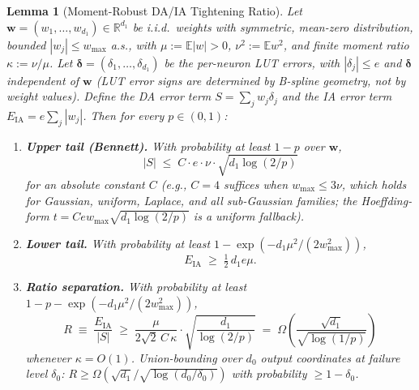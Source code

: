 \documentclass[journal,onecolumn]{IEEEtran}
\newtheorem{lemma}{Lemma}
\begin{document}
\setcounter{lemma}{2}
\begin{lemma}[Moment-Robust DA/IA Tightening Ratio]
\label{lem:da_moment}
Let $\mathbf{w} = (w_1, \dots, w_{d_1}) \in \mathbb{R}^{d_1}$ be
i.i.d.\ weights with symmetric, mean-zero distribution, bounded
$|w_j| \leq w_{\max}$ a.s., with $\mu := \mathbb{E}|w| > 0$,
$\nu^2 := \mathbb{E} w^2$, and finite moment ratio
$\kappa := \nu/\mu$. Let $\boldsymbol{\delta} = (\delta_1, \dots,
\delta_{d_1})$ be the per-neuron LUT errors, with $|\delta_j| \leq e$
and $\boldsymbol{\delta}$ \emph{independent of} $\mathbf{w}$ (LUT error
signs are determined by B-spline geometry, not by weight values). Define
the DA error term $S = \sum_j w_j \delta_j$ and the IA error term
$E_{\text{IA}} = e \sum_j |w_j|$. Then for every $p \in (0,1)$:

\begin{enumerate}
    \item \textbf{Upper tail (Bennett).} With probability at least
    $1-p$ over $\mathbf{w}$,
    \begin{equation}
    |S| \;\leq\; C \cdot e \cdot \nu \cdot \sqrt{d_1 \log(2/p)}
    \label{eq:bennett_upper}
    \end{equation}
    for an absolute constant $C$ (e.g., $C = 4$ suffices when
    $w_{\max} \leq 3\nu$, which holds for Gaussian, uniform, Laplace,
    and all sub-Gaussian families; the Hoeffding-form
    $t = C e w_{\max}\sqrt{d_1 \log(2/p)}$ is a uniform fallback).

    \item \textbf{Lower tail.} With probability at least
    $1 - \exp(-d_1 \mu^2 / (2 w_{\max}^2))$,
    \begin{equation}
    E_{\text{IA}} \;\geq\; \tfrac{1}{2}\, d_1 e \mu.
    \label{eq:lower_tail}
    \end{equation}

    \item \textbf{Ratio separation.} With probability at least
    $1 - p - \exp(-d_1\mu^2/(2w_{\max}^2))$,
    \begin{equation}
    R \;\equiv\; \frac{E_{\text{IA}}}{|S|} \;\geq\;
    \frac{\mu}{2\sqrt{2}\, C\, \kappa} \cdot
    \sqrt{\frac{d_1}{\log(2/p)}}
    \;=\; \Omega\!\left( \frac{\sqrt{d_1}}{\sqrt{\log(1/p)}} \right)
    \label{eq:moment_ratio}
    \end{equation}
    whenever $\kappa = O(1)$. Union-bounding over $d_0$ output
    coordinates at failure level $\delta_0$:
    $R \geq \Omega(\sqrt{d_1}/\sqrt{\log(d_0/\delta_0)})$ with
    probability $\geq 1 - \delta_0$.
\end{enumerate}


\end{lemma}
\end{document}
